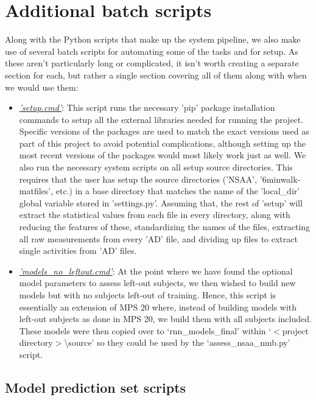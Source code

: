 \documentclass[12pt,twoside]{report}
\begin{document}
\section{Additional batch scripts}

\quad Along with the Python scripts that make up the system pipeline, we also make use of several batch scripts for automating some of the tasks and for setup. As these aren't particularly long or complicated, it isn't worth creating a separate section for each, but rather a single section covering all of them along with when we would use them:

\begin{itemize}
	\item \underline{\textit{'setup.cmd'}}: This script runs the necessary 'pip' package installation commands to setup all the external libraries needed for running the project. Specific versions of the packages are used to match the exact versions used as part of this project to avoid potential complications, although setting up the most recent versions of the packages would most likely work just as well. We also run the necessary system scripts on all setup source directories. This requires that the user has setup the source directories ('NSAA', '6minwalk-matfiles', etc.) in a base directory that matches the name of the 'local\_dir' global variable stored in 'settings.py'. Assuming that, the rest of 'setup' will extract the statistical values from each file in every directory, along with reducing the features of these, standardizing the names of the files, extracting all raw measurements from every 'AD' file, and dividing up files to extract single activities from 'AD' files.
	\item \underline{\textit{'models\_no\_leftout.cmd'}}: At the point where we have found the optional model parameters to assess left-out subjects, we then wished to build new models but with no subjects left-out of training. Hence, this script is essentially an extension of MPS 20 where, instead of building models with left-out subjects as done in MPS 20, we build them with all subjects included. These models were then copied over to ‘rnn\_models\_final’ within ‘$<$project directory$>$\textbackslash source’ so they could be used by the ‘assess\_nsaa\_nmb.py’ script.
\end{itemize}

\subsection{Model prediction set scripts}
\end{document}
